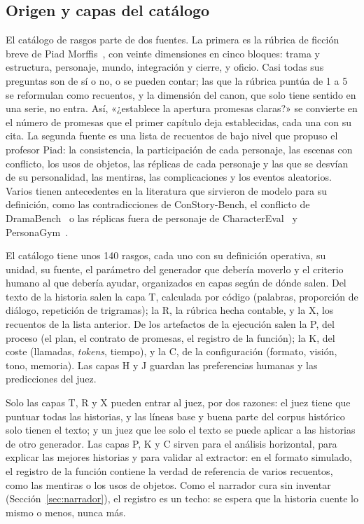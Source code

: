 \subsection{Origen y capas del catálogo}\label{sec:catalogo}

El catálogo de rasgos parte de dos fuentes. La primera es la rúbrica de ficción breve de Piad
Morffis~\cite{piad2026}, con veinte dimensiones en cinco bloques: trama y estructura, personaje,
mundo, integración y cierre, y oficio. Casi todas sus preguntas son de sí o no, o se pueden contar;
las que la rúbrica puntúa de 1 a 5 se reformulan como recuentos, y la dimensión del canon, que solo
tiene sentido en una serie, no entra. Así, «¿establece la apertura promesas claras?» se convierte en
el número de promesas que el primer capítulo deja establecidas, cada una con su cita. La segunda
fuente es una lista de recuentos de bajo nivel que propuso el profesor Piad: la consistencia,
la participación de cada personaje, las escenas con conflicto, los usos de objetos, las réplicas de
cada personaje y las que se desvían de su personalidad, las mentiras, las complicaciones y los
eventos aleatorios. Varios tienen antecedentes en la literatura que sirvieron de modelo para su
definición, como las contradicciones de ConStory-Bench, el conflicto de DramaBench~\cite{ma2025} o
las réplicas fuera de personaje de CharacterEval~\cite{tu2024} y PersonaGym~\cite{samuel2025}.

El catálogo tiene unos 140 rasgos, cada uno con su definición operativa, su unidad, su fuente, el
parámetro del generador que debería moverlo y el criterio humano al que debería ayudar, organizados
en capas según de dónde salen. Del texto de la historia salen la capa T, calculada por código
(palabras, proporción de diálogo, repetición de trigramas); la R, la rúbrica hecha contable, y la X,
los recuentos de la lista anterior. De los artefactos de la ejecución salen la P, del proceso (el
plan, el contrato de promesas, el registro de la función); la K, del coste (llamadas,
\textit{tokens}, tiempo), y la C, de la configuración (formato, visión, tono, memoria). Las capas H y
J guardan las preferencias humanas y las predicciones del juez.

Solo las capas T, R y X pueden entrar al juez, por dos razones: el juez tiene que puntuar todas las
historias, y las líneas base y buena parte del corpus histórico solo tienen el texto; y un juez que
lee solo el texto se puede aplicar a las historias de otro generador. Las capas P, K y C sirven para
el análisis horizontal, para explicar las mejores historias y para validar al extractor: en el
formato simulado, el registro de la función contiene la verdad de referencia de varios recuentos,
como las mentiras o los usos de objetos. Como el narrador cura sin inventar
(Sección~\ref{sec:narrador}), el registro es un techo: se espera que la historia cuente lo mismo o
menos, nunca más.

